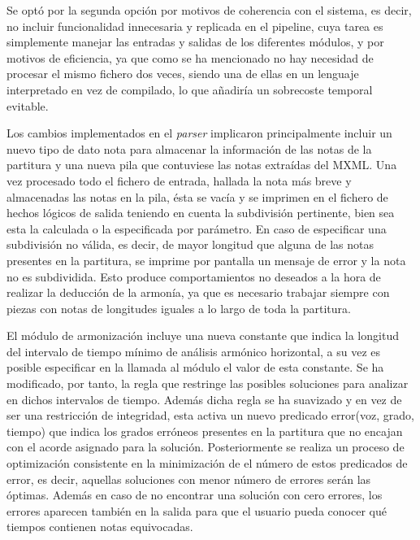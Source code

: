 Se optó por la segunda opción por motivos de coherencia con el sistema, es decir, no incluir funcionalidad innecesaria y replicada en el pipeline, cuya tarea es simplemente manejar las entradas y salidas de los diferentes módulos, y por motivos de eficiencia, ya que como se ha mencionado no hay necesidad de procesar el mismo fichero dos veces, siendo una de ellas en un lenguaje interpretado en vez de compilado, lo que añadiría un sobrecoste temporal evitable.

Los cambios implementados en el \textit{parser} implicaron principalmente incluir un nuevo tipo de dato nota para almacenar la información de las notas de la partitura y una nueva pila que contuviese las notas extraídas del MXML. Una vez procesado todo el fichero de entrada, hallada la nota más breve y almacenadas las notas en la pila, ésta se vacía y se imprimen en el fichero de hechos lógicos de salida teniendo en cuenta la subdivisión pertinente, bien sea esta la calculada o la especificada por parámetro. En caso de especificar una subdivisión no válida, es decir, de mayor longitud que alguna de las notas presentes en la partitura, se imprime por pantalla un mensaje de error y la nota no es subdividida. Esto produce comportamientos no deseados a la hora de realizar la deducción de la armonía, ya que es necesario trabajar siempre con piezas con notas de longitudes iguales a lo largo de toda la partitura.

El módulo de armonización incluye una nueva constante que indica la longitud del intervalo de tiempo mínimo de análisis armónico horizontal, a su vez es posible especificar en la llamada al módulo el valor de esta constante. Se ha modificado, por tanto, la regla que restringe las posibles soluciones para analizar en dichos intervalos de tiempo. Además dicha regla se ha suavizado y en vez de ser una restricción de integridad, esta activa un nuevo predicado error(voz, grado, tiempo) que indica los grados erróneos presentes en la partitura que no encajan con el acorde asignado para la solución. Posteriormente se realiza un proceso de optimización consistente en la minimización de el número de estos predicados de error, es decir, aquellas soluciones con menor número de errores serán las óptimas. Además en caso de no encontrar una solución con cero errores, los errores aparecen también en la salida para que el usuario pueda conocer qué tiempos contienen notas equivocadas.

